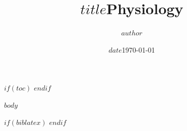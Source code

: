 \documentclass[twocolumn]{article}
\author{$author$}
\author{}
\title{$title$}
\title{Physiology}
\date{$date$}
\date{\today}
\begin{document}
\onecolumn
\maketitle

$if(toc)$
\tableofcontents
\clearpage
$endif$

\twocolumn

$body$

$if(biblatex)$
\newpage
\onecolumn
\printbibliography
$endif$
\end{document}
